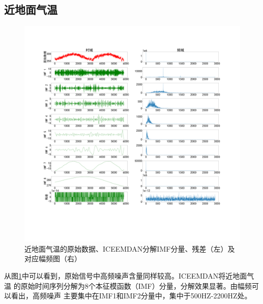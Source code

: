 \documentclass[AutoFakeBold]{LZUThesis}
\begin{document}
\subsection{近地面气温}
\begin{figure}[H]
	\centering
    \includegraphics[width=1\textwidth]{figures/temp.pdf}
    \caption{近地面气温的原始数据、ICEEMDAN分解IMF分量、残差（左）及对应幅频图（右）}
    \label{fig_temp}
\end{figure}

从图\ref{fig_temp}中可以看到，原始信号中高频噪声含量同样较高。ICEEMDAN将近地面气温
的原始时间序列分解为8个本征模函数（IMF）分量，分解效果显著。由幅频可以看出，高频噪声
主要集中在IMF1和IMF2分量中，集中于500HZ-2200HZ处。
\end{document}
